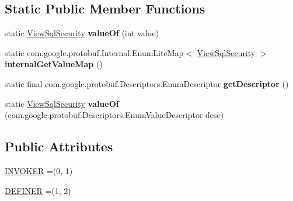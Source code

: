 \subsection*{Static Public Member Functions}
\begin{DoxyCompactItemize}
\item 
\mbox{\label{enumcom_1_1mysql_1_1cj_1_1x_1_1protobuf_1_1_mysqlx_crud_1_1_view_sql_security_a41f05899b6d990443586fa60d68b3cf7}} 
static \mbox{\hyperlink{enumcom_1_1mysql_1_1cj_1_1x_1_1protobuf_1_1_mysqlx_crud_1_1_view_sql_security}{View\+Sql\+Security}} {\bfseries value\+Of} (int value)
\item 
\mbox{\label{enumcom_1_1mysql_1_1cj_1_1x_1_1protobuf_1_1_mysqlx_crud_1_1_view_sql_security_a36cdc91062a8a22f18f3e4fad0439e6e}} 
static com.\+google.\+protobuf.\+Internal.\+Enum\+Lite\+Map$<$ \mbox{\hyperlink{enumcom_1_1mysql_1_1cj_1_1x_1_1protobuf_1_1_mysqlx_crud_1_1_view_sql_security}{View\+Sql\+Security}} $>$ {\bfseries internal\+Get\+Value\+Map} ()
\item 
\mbox{\label{enumcom_1_1mysql_1_1cj_1_1x_1_1protobuf_1_1_mysqlx_crud_1_1_view_sql_security_a411306c342142fed4a61dcd4e6a72acb}} 
static final com.\+google.\+protobuf.\+Descriptors.\+Enum\+Descriptor {\bfseries get\+Descriptor} ()
\item 
\mbox{\label{enumcom_1_1mysql_1_1cj_1_1x_1_1protobuf_1_1_mysqlx_crud_1_1_view_sql_security_a38c65d98fdac69daab036dc8a0202dc8}} 
static \mbox{\hyperlink{enumcom_1_1mysql_1_1cj_1_1x_1_1protobuf_1_1_mysqlx_crud_1_1_view_sql_security}{View\+Sql\+Security}} {\bfseries value\+Of} (com.\+google.\+protobuf.\+Descriptors.\+Enum\+Value\+Descriptor desc)
\end{DoxyCompactItemize}
\subsection*{Public Attributes}
\begin{DoxyCompactItemize}
\item 
\mbox{\hyperlink{enumcom_1_1mysql_1_1cj_1_1x_1_1protobuf_1_1_mysqlx_crud_1_1_view_sql_security_a93a91bf633f0b17b1a2b4a1daa17fe7d}{I\+N\+V\+O\+K\+ER}} =(0, 1)
\item 
\mbox{\hyperlink{enumcom_1_1mysql_1_1cj_1_1x_1_1protobuf_1_1_mysqlx_crud_1_1_view_sql_security_aec1137dbb0a2be64956f2b0552a9686e}{D\+E\+F\+I\+N\+ER}} =(1, 2)
\end{DoxyCompactItemize}
